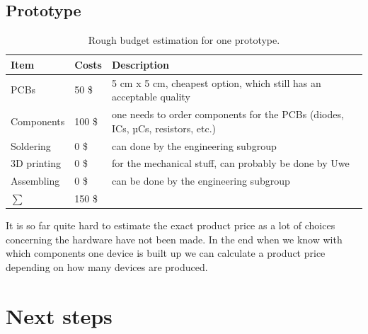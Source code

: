 \documentclass{report}
\begin{document}
\section{Prototype}
\begin{table}[H]
\centering
\begin{tabular}{lll}
\textbf{Item} & \textbf{Costs} & \textbf{Description}                                                           \\\hline
PCBs          & 50 \$          & 5 cm x 5 cm, cheapest option, which still has an acceptable quality            \\
Components    & 100 \$         & one needs to order components for the PCBs (diodes, ICs, µCs, resistors, etc.) \\
Soldering     & 0 \$           & can done by the engineering subgroup                                           \\
3D printing   & 0 \$           & for the mechanical stuff, can probably be done by Uwe                          \\
Assembling    & 0 \$           & can be done by the engineering subgroup                                       	\\\hline
\ensuremath{\sum}& 150 \$
\end{tabular}
\caption{Rough budget estimation for one prototype.}
\label{tab:prototype_budget}
\end{table}
It is so far quite hard to estimate the exact product price as a lot of choices concerning the hardware have not been made. In the end when we know with which components one device is built up we can calculate a product price depending on how many devices are produced.  

\chapter{Next steps}
\end{document}
